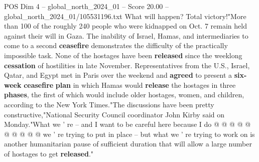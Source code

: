 \begin{textsample}{POS Dim 4 – global\_north\_2024\_01 – Score 20.00 – global\_north\_2024\_01/105531196.txt}
What will happen?
Total victory!"More than 100 of the roughly 240 people who were kidnapped on Oct. 7 remain held against their will in Gaza.
The inability of Israel, Hamas, and intermediaries to come to a second \textbf{ceasefire} demonstrates the difficulty of the practically impossible task.
None of the hostages have been \textbf{released} since the weeklong \textbf{cessation} of hostilities in late November.
Representatives from the U.S., Israel, Qatar, and Egypt met in Paris over the weekend and \textbf{agreed} to present a \textbf{six-week} \textbf{ceasefire} \textbf{plan} in which Hamas would \textbf{release} the hostages in three \textbf{phases}, the first of which would include older hostages, women, and children, according to the New York Times."The discussions have been pretty constructive,"National Security Council coordinator John Kirby said on Monday."What we ' re -- and I want to be careful here because I do @ @ @ @ @ @ @ @ @ @ we ' re trying to put in place -- but what we ' re trying to work on is another humanitarian pause of sufficient duration that will allow a large number of hostages to get \textbf{released}."

\end{textsample}

